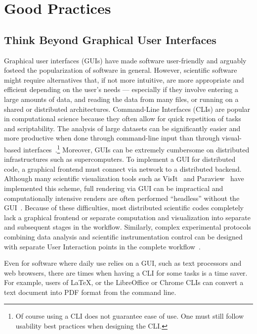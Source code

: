 \documentclass[conference]{IEEEtran}
\begin{document}
\section{Good Practices}

\subsection{Think Beyond Graphical User Interfaces}
\label{sec:beyond:GUIs}
Graphical user interfaces (GUIs) have made software user-friendly and 
arguably fosteed the popularization of software in general. However, scientific 
software might require alternatives that, if not more intuitive, are more 
appropriate and efficient depending on the user's needs --- especially if they 
involve entering a large amounts of data, and reading the data from many files, 
or running on a shared or distributed architectures.
Command-Line Interfaces (CLIs) are popular in computational science because they 
often allow for quick repetition of tasks~\cite{bestprSC} and scriptability.
The analysis of large datasets can be significantly easier and more productive 
when done through command-line input than through visual-based interfaces~\cite{Springmeyer:1993}.\footnote{Of course using a CLI does not guarantee ease of use. One must still follow usability best practices when designing the CLI.}
Moreover, GUIs can be extremely cumbersome on distributed infrastructures 
such as supercomputers.
To implement a GUI for distributed code, a graphical frontend must connect via 
network to a distributed backend. Although many scientific visualization tools 
such as VisIt~\cite{HPV:VisIt} and Paraview~\cite{ahrens2005paraview, ayachit2015paraview} 
have implemented this scheme, full rendering via GUI can be impractical and computationally intensive renders are often performed ``headless'' without the GUI~\cite{HPV:VisIt}.
Because of these difficulties, most distributed scientific codes completely 
lack a graphical frontend or separate computation and visualization into separate and 
subsequent stages in the workflow. Similarly, complex experimental protocols 
combining data analysis and scientific instrumentation control can be designed 
with separate User Interaction points in the complete workflow~\cite{Brockhauser:gm5021}.

Even for software where daily use relies on a GUI, such as text
processors and web browsers, there are times when having a CLI for
some tasks is a time saver. For example, users of LaTeX, or the
LibreOffice or Chrome CLIs can convert a text document into PDF format
from the command line.
\end{document}
